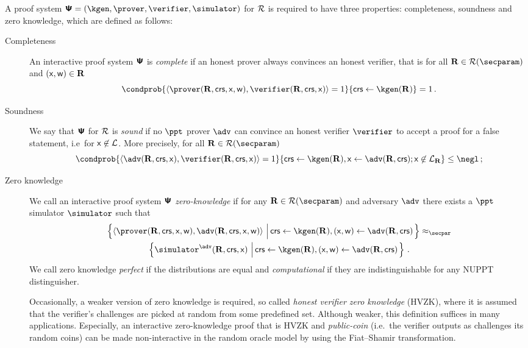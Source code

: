 \let\accentvec\vec \documentclass[runningheads,10pt]{llncs}
\begin{document}
A proof system $\proofsystem = (\kgen, \prover, \verifier, \simulator)$ for $\mathcal{R}$ is required to have three properties: completeness, soundness and zero knowledge, which are defined as follows:
\begin{description}
	\item[Completeness] An interactive proof system $\bm{\mathsf{\Psi}}$ is
			\emph{complete} if an honest prover always convinces an honest verifier,
			that is for all $\REL \in \RELGEN(\secparam)$ and $(\mathsf{x}, \mathsf{w}) \in \mathbf{R}$
	\[
		\condprob{\ip{\prover (\REL, \crs, \inp, \wit)}{\verifier (\REL, \crs,
		\inp)} = 1}{\crs \gets \kgen(\REL)} = 1\,.
	\]
	\item[Soundness] We say that $\bm{\mathsf{\Psi}}$ for $\mathcal{R}$ is \emph{sound} if
			no $\ppt$ prover $\adv$ can convince an honest verifier $\verifier$ to
			accept a proof for a false statement, i.e~for $\mathsf{x} \not\in\mathcal{L}$. More
			precisely, for all $\REL \in \RELGEN(\secparam)$
	\[
		\condprob{\ip{\adv(\REL, \crs, \inp)}{\verifier(\REL, \crs, \inp)} =
		1}{\crs \gets \kgen(\REL), \inp \gets \adv(\REL, \crs); \inp \not\in \LANG_\REL} \leq \negl\,;
	\]
	\item[Zero knowledge] We call an interactive proof system $\bm{\mathsf{\Psi}}$
			\emph{zero-knowledge} if for any $\REL \in \RELGEN(\secparam)$ and adversary $\adv$ there exists a $\ppt$ simulator $\simulator$ such that
	\begin{multline*}
	  \left\{\ip{\prover(\REL, \crs, \inp, \wit)}{\adv(\REL, \crs, \inp, \wit)} \,\left|\, \crs \gets \kgen(\REL), (\inp, \wit) \gets \adv(\REL, \crs)\vphantom{\simulator^\adv}\right.\right\} \approx_\secpar
		\\
		\left\{\simulator^{\adv}(\REL, \crs, \inp)\,\left|\, \crs \gets \kgen(\REL), (\inp, \wit) \gets \adv(\REL, \crs)\vphantom{\simulator^\adv}\right.\right\}\,.
	\end{multline*}
	We call zero knowledge \emph{perfect} if the distributions are equal and \emph{computational} if they are indistinguishable for any NUPPT distinguisher.

	Occasionally, a weaker version of zero knowledge is required, so called
	\emph{honest verifier zero knowledge} (HVZK), where it is assumed that the
	verifier's challenges are picked at random from some predefined set.
	Although weaker, this definition suffices in many applications. Especially,
	an interactive zero-knowledge proof that is HVZK and \emph{public-coin}
	(i.e.~the verifier outputs as challenges its random coins) can be made
	non-interactive in the random oracle model by using the Fiat--Shamir
	transformation. 
	

\end{description}
\end{document}
